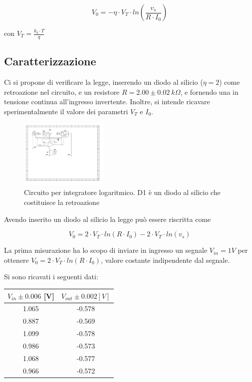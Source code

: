 \documentclass[journal]{IEEEtran}
\begin{document}
\begin{equation}
V_0 = - \eta \cdot V_T \cdot ln( \frac{v_s}{R \cdot I_0} )
\end{equation}

con $V_T = \frac{k_{b} \cdot T}{q}$ \\
\subsection{\textbf{Caratterizzazione}}
Ci si propone di verificare la legge, inserendo un diodo al silicio ($\eta = 2$) come retroazione nel circuito, e un resistore $R = 2.00 \pm 0.02 \ k\Omega$, e fornendo una in tensione continua all'ingresso invertente. Inoltre, si intende ricavare sperimentalmente il valore dei parametri $V_T$ e $I_0$.

\begin{figure}[H]%
\begin {center}
\includegraphics[width=0.38\textwidth]{sch-simulations/output/OPA-log.pdf}
\caption{Circuito per integratore logaritmico. D1 è un diodo al silicio che costituisce la retroazione}
\label{fig:circ_log_ampl}
\end {center}
\end{figure}

Avendo inserito un diodo al silicio la legge può essere riscritta come 

\begin{equation}
V_0 = 2 \cdot V_T \cdot ln(R \cdot I_0) - 2 \cdot V_T \cdot ln(v_s)
\end{equation}

La prima misurazione ha lo scopo di inviare in ingresso un segnale $V_{in} = 1V$ per ottenere  $V_0 = 2 \cdot V_T \cdot ln(R \cdot I_0)$, valore costante indipendente dal segnale.

Si sono ricavati i seguenti dati:

\begin{center}
\begin{tabular}{|c|c|}
\hline
$V_{in} \pm 0.006 $ [V] & $V_{out} \pm 0.002 [V]$   \\ \hline
1.065 & -0.578 \\ \hline
0.887 & -0.569 \\ \hline
1.099 & -0.578 \\ \hline
0.986 & -0.573 \\ \hline
1.068 & -0.577 \\ \hline
0.966 & -0.572 \\ \hline
\end{tabular}
\end{center}
\end{document}
